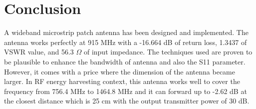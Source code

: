 \documentclass[conference]{IEEEtran}
\begin{document}
\section{Conclusion}
A wideband microstrip patch antenna has been designed and implemented. The antenna works perfectly at 915 MHz with a -16.664 dB of return loss, 1.3437 of VSWR value, and 56.3 $\Omega$ of input impedance. The techniques used are proven to be plausible to enhance the bandwidth of antenna and also the S11 parameter. However, it comes with a price where the dimension of the antenna became larger. In RF energy harvesting context, this antenna works well to cover the frequency from 756.4 MHz to 1464.8 MHz and it can forward up to -2.62 dB at the closest distance which is 25 cm with the output transmitter power of 30 dB.




\end{document}
